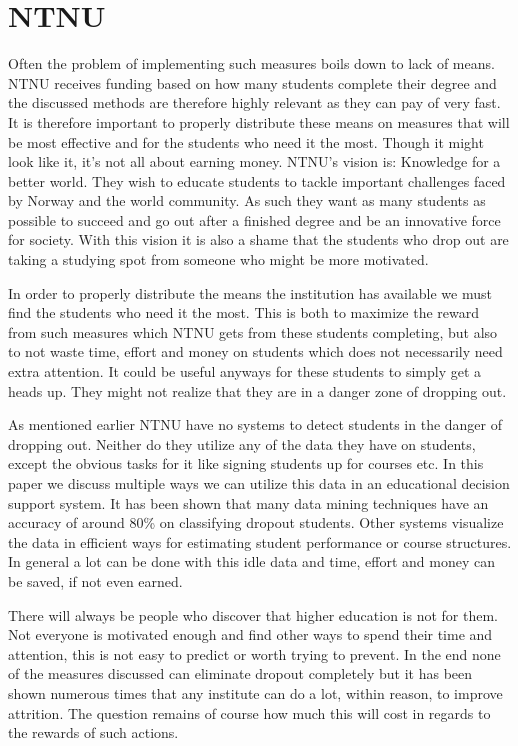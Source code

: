 \section{NTNU}
Often the problem of implementing such measures boils down to lack of means.
NTNU receives funding based on how many students complete their degree and the discussed methods are therefore highly relevant as they can pay of very fast.
It is therefore important to properly distribute these means on measures that will be most effective and for the students who need it the most.
Though it might look like it, it's not all about earning money.
NTNU's vision is: Knowledge for a better world.
They wish to educate students to tackle important challenges faced by Norway and the world community.
As such they want as many students as possible to succeed and go out after a finished degree and be an innovative force for society. 
With this vision it is also a shame that the students who drop out are taking a studying spot from someone who might be more motivated.

\bigskip\noindent
In order to properly distribute the means the institution has available we must find the students who need it the most.
This is both to maximize the reward from such measures which NTNU gets from these students completing, but also to not waste time, effort and money on students which does not necessarily need extra attention.
It could be useful anyways for these students to simply get a heads up.
They might not realize that they are in a danger zone of dropping out.

\bigskip\noindent
As mentioned earlier NTNU have no systems to detect students in the danger of dropping out.
Neither do they utilize any of the data they have on students, except the obvious tasks for it like signing students up for courses etc. 
In this paper we discuss multiple ways we can utilize this data in an educational decision support system.
It has been shown that many data mining techniques have an accuracy of around 80\% on classifying dropout students.
Other systems visualize the data in efficient ways for estimating student performance or course structures. 
In general a lot can be done with this idle data and time, effort and money can be saved, if not even earned.

\bigskip\noindent
There will always be people who discover that higher education is not for them.
Not everyone is motivated enough and find other ways to spend their time and attention, this is not easy to predict or worth trying to prevent.
In the end none of the measures discussed can eliminate dropout completely but it has been shown numerous times that any institute can do a lot, within reason, to improve attrition. 
The question remains of course how much this will cost in regards to the rewards of such actions.